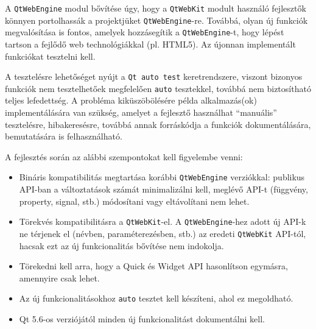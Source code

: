 \documentclass[12pt]{report}
\begin{document}
\noindent
A \texttt{QtWebEngine} modul bővítése úgy, hogy a \texttt{QtWebKit} modult használó
fejlesztők könnyen portolhassák a projektjüket \texttt{QtWebEngine}-re.
Továbbá, olyan új funkciók megvalósítása is fontos, amelyek hozzásegítik a
\texttt{QtWebEngine}-t, hogy lépést tartson a fejlődő web technológiákkal (pl. HTML5).
Az újonnan implementált funkciókat tesztelni kell.

\bigskip
\noindent
A tesztelésre lehetőséget nyújt a \texttt{Qt auto test}
keretrendszere, viszont bizonyos funkciók nem tesztelhetőek megfelelően \texttt{auto}
tesztekkel, továbbá nem biztosítható teljes lefedettség. A probléma kiküszöbölésére
példa alkalmazás(ok) implementálására van szükség, amelyet a fejlesztő használhat
``manuális'' tesztelésre, hibakeresésre, továbbá annak forráskódja a funkciók dokumentálására,
bemutatására is felhasználható.

\bigskip
\noindent
A fejlesztés során az alábbi szempontokat kell figyelembe venni:
\begin{itemize}
    \item Bináris kompatibilitás megtartása korábbi \texttt{QtWebEngine}
        verziókkal: publikus API-ban a változtatások számát minimalizálni kell,
        meglévő API-t (függvény, \\
        property, signal, stb.) módosítani vagy eltávolítani
        nem lehet.
    \item Törekvés kompatibilitásra a \texttt{QtWebKit}-el.
        A \texttt{QtWebEngine}-hez adott új \mbox{API-k} ne térjenek el
        (névben, paraméterezésben, stb.) az eredeti \texttt{QtWebKit} API-tól, hacsak ezt
        az új funkcionalitás bővítése nem indokolja.
    \item Törekedni kell arra, hogy a Quick és Widget API hasonlítson egymásra,
        amennyire csak lehet.
    \item Az új funkcionalitásokhoz \texttt{auto} tesztet kell készíteni,
        ahol ez megoldható.
    \item Qt 5.6-os verziójától minden új funkcionalitást dokumentálni kell.
\end{itemize}
\end{document}
